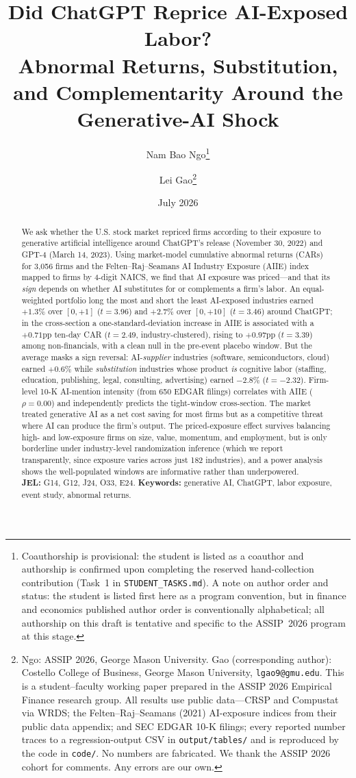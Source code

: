 \documentclass[12pt]{article}
\title{\textbf{Did ChatGPT Reprice AI-Exposed Labor?\\
Abnormal Returns, Substitution, and Complementarity Around the Generative-AI Shock}}
\author{Nam Bao Ngo\thanks{Coauthorship is provisional: the student is listed as a coauthor and authorship is confirmed upon completing the reserved hand-collection contribution (Task~1 in \texttt{STUDENT\_TASKS.md}). A note on author order and status: the student is listed first here as a program convention, but in finance and economics published author order is conventionally alphabetical; all authorship on this draft is tentative and specific to the ASSIP~2026 program at this stage.} \and Lei Gao\thanks{Ngo: ASSIP 2026, George Mason University.
Gao (corresponding author): Costello College of Business, George Mason University,
\texttt{lgao9@gmu.edu}. This is a student--faculty working paper prepared in the ASSIP 2026
Empirical Finance research group. All results use public data---CRSP and Compustat via WRDS;
the Felten--Raj--Seamans (2021) AI-exposure indices from their public data appendix; and SEC
EDGAR 10-K filings; every reported number traces to a regression-output CSV in
\texttt{output/tables/} and is reproduced by the code in \texttt{code/}. No numbers are
fabricated. We thank the ASSIP 2026 cohort for comments. Any errors are our own.}}
\date{July 2026}
\newcommand{\edgarnfirms}{650}\newcommand{\edgarcorr}{0.00}\newcommand{\edgarshare}{0}}
\begin{document}
\maketitle

\begin{abstract}
\noindent We ask whether the U.S. stock market repriced firms according to their
exposure to generative artificial intelligence around ChatGPT's release
(November 30, 2022) and GPT-4 (March 14, 2023). Using market-model cumulative
abnormal returns (CARs) for 3{,}056 firms and the Felten--Raj--Seamans AI Industry
Exposure (AIIE) index mapped to firms by 4-digit NAICS, we find that AI exposure was
priced---and that its \emph{sign} depends on whether AI substitutes for or complements
a firm's labor. An equal-weighted portfolio long the most and short the least
AI-exposed industries earned $+1.3\%$ over $[0,+1]$ ($t=3.96$) and $+2.7\%$ over
$[0,+10]$ ($t=3.46$) around ChatGPT; in the cross-section a one-standard-deviation
increase in AIIE is associated with a $+0.71$pp ten-day CAR ($t=2.49$, industry-clustered),
rising to $+0.97$pp ($t=3.39$) among non-financials, with a clean null in the
pre-event placebo window. But the average masks a sign reversal: AI-\emph{supplier}
industries (software, semiconductors, cloud) earned $+0.6\%$ while
\emph{substitution} industries whose product \emph{is} cognitive labor
(staffing, education, publishing, legal, consulting, advertising) earned $-2.8\%$
($t=-2.32$). Firm-level 10-K AI-mention intensity (from \edgarnfirms{} EDGAR filings)
correlates with AIIE ($\rho=\edgarcorr$) and independently predicts the tight-window
cross-section. The market treated generative AI as a net cost saving for most firms
but as a competitive threat where AI can produce the firm's output. The priced-exposure effect
survives balancing high- and low-exposure firms on size, value, momentum, and employment, but is
only borderline under industry-level randomization inference (which we report transparently, since
exposure varies across just 182 industries), and a power analysis shows the well-populated windows
are informative rather than underpowered. \\[4pt]
\noindent\textbf{JEL:} G14, G12, J24, O33, E24. \quad
\textbf{Keywords:} generative AI, ChatGPT, labor exposure, event study, abnormal returns.
\end{abstract}
\end{document}
